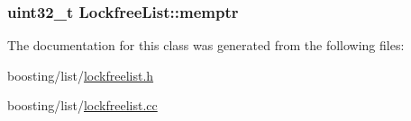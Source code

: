 \hypertarget{classLockfreeList_a78e6c8b4f10d02a43b6a4c75e383496a}{
\subsubsection[{memptr}]{\setlength{\rightskip}{0pt plus 5cm}uint32\-\_\-t Lockfree\-List\-::memptr\hspace{0.3cm}{\ttfamily [private]}}}\label{classLockfreeList_a78e6c8b4f10d02a43b6a4c75e383496a}


The documentation for this class was generated from the following files\-:\begin{DoxyCompactItemize}
\item 
boosting/list/\hyperlink{lockfreelist_8h}{lockfreelist.\-h}\item 
boosting/list/\hyperlink{lockfreelist_8cc}{lockfreelist.\-cc}\end{DoxyCompactItemize}
